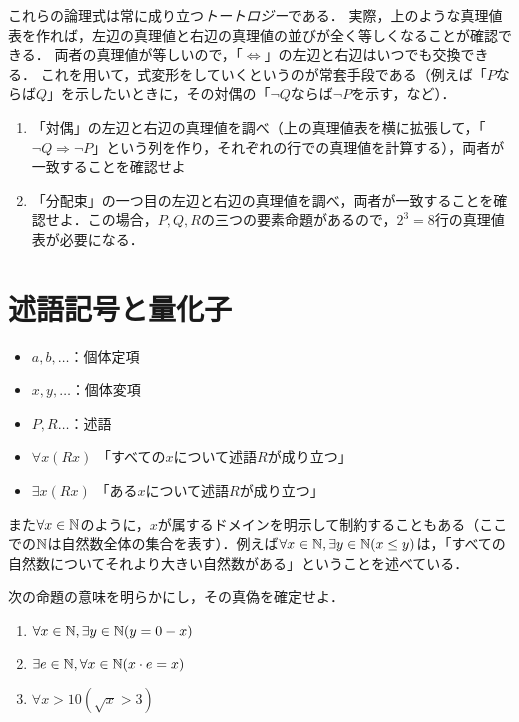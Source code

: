 \documentclass[11pt,a4paper]{jsarticle}
\begin{document}
これらの論理式は常に成り立つ\emph{トートロジー}である．
実際，上のような真理値表を作れば，左辺の真理値と右辺の真理値の並びが全く等しくなることが確認できる．
両者の真理値が等しいので，「$\iff$」の左辺と右辺はいつでも交換できる．
これを用いて，式変形をしていくというのが常套手段である（例えば「$P$ならば$Q$」を示したいときに，その対偶の「$\neg Q$ならば$\neg P$を示す，など）．


\begin{exercise} 
 \begin{enumerate}
     \item 「対偶」の左辺と右辺の真理値を調べ（上の真理値表を横に拡張して，「$\neg Q \Rightarrow \neg P$」という列を作り，それぞれの行での真理値を計算する），両者が一致することを確認せよ
     \item 「分配束」の一つ目の左辺と右辺の真理値を調べ，両者が一致することを確認せよ．この場合，$P, Q, R$の三つの要素命題があるので，$2^3=8$行の真理値表が必要になる．
 \end{enumerate}
\end{exercise}

\section{述語記号と量化子}
\begin{itemize}
 \item $a, b, \dots$：個体定項
 \item $x, y, \dots$：個体変項
 \item $P, R \dots$：述語
 \item $\forall x (Rx)$ 「すべての$x$について述語$R$が成り立つ」
 \item $\exists x (Rx)$ 「ある$x$について述語$R$が成り立つ」
\end{itemize}

また$\forall x \in \mathbb{N}$のように，$x$が属するドメインを明示して制約することもある（ここでの$\mathbb{N}$は自然数全体の集合を表す）．例えば$\forall x \in \mathbb{N}, \exists y \in \mathbb{N} (x \leq y)$は，「すべての自然数についてそれより大きい自然数がある」ということを述べている．



\begin{exercise}
 次の命題の意味を明らかにし，その真偽を確定せよ．
\begin{enumerate}
 \item $\forall x \in \mathbb{N}, \exists y \in \mathbb{N} (y = 0 - x)$
 \item $\exists e \in \mathbb{N}, \forall x \in \mathbb{N} (x \cdot e = x)$
 \item $\forall x > 10 (\sqrt{x} > 3)$
\end{enumerate}
\end{exercise}
\end{document}
